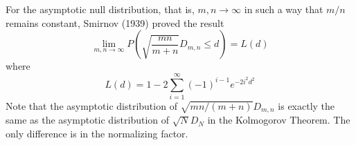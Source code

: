 For the asymptotic null distribution, that is, $m, n \rightarrow \infty$ in such a way that $m / n$ remains constant, Smirnov (1939) proved the result
\[
\lim _{m, n \rightarrow \infty} P\left(\sqrt{\frac{m n}{m+n}} D_{m, n} \leq d\right)=L(d)
\]
where
\[
L(d)=1-2 \sum_{i=1}^{\infty}(-1)^{i-1} e^{-2 i^2 d^2}
\]
Note that the asymptotic distribution of $\sqrt{m n /(m+n)} D_{m, n}$ is exactly the same as the asymptotic distribution of $\sqrt{N} D_N$ in the Kolmogorov Theorem. The only difference is in the normalizing factor.
